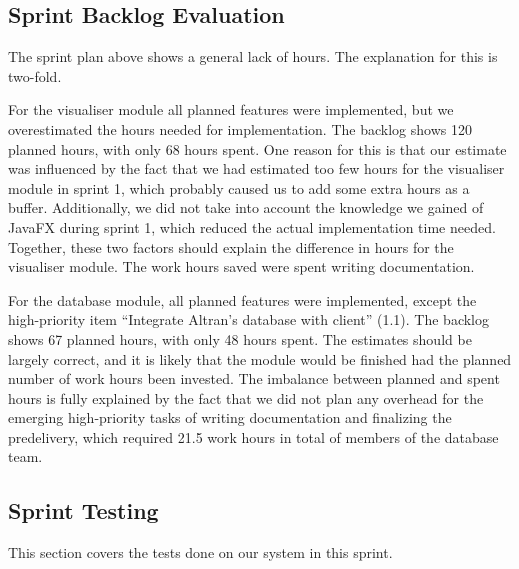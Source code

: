 \documentclass[../document]{subfiles}
\begin{document}
\subsection{Sprint Backlog Evaluation}
The sprint plan above shows a general lack of hours. The explanation for this is two-fold.

For the visualiser module all planned features were implemented, but we overestimated the hours needed for implementation. The backlog shows 120 planned hours, with only 68 hours spent. One reason for this is that our estimate was influenced by the fact that we had estimated too few hours for the visualiser module in sprint 1, which probably caused us to add some extra hours as a buffer. Additionally, we did not take into account the knowledge we gained of JavaFX during sprint 1, which reduced the actual implementation time needed. Together, these two factors should explain the difference in hours for the visualiser module. The work hours saved were spent writing documentation.

For the database module, all planned features were implemented, except the high-priority item “Integrate \gls{Altran}'s database with client” (1.1). The backlog shows 67 planned hours, with only 48 hours spent. The estimates should be largely correct, and it is likely that the module would be finished had the planned number of work hours been invested. The imbalance between planned and spent hours is fully explained by the fact that we did not plan any overhead for the emerging high-priority tasks of writing documentation and finalizing the predelivery, which required 21.5 work hours in total of members of the database team.

\subsection{Sprint Testing}
This section covers the tests done on our system in this sprint.
\end{document}
